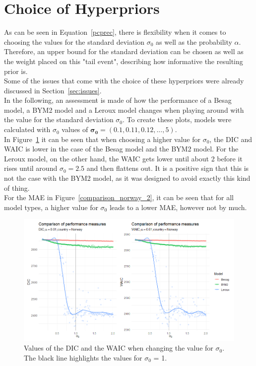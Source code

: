 \section{Choice of Hyperpriors}\label{sec:hyperprios}
As can be seen in Equation~\ref{pcprec}, there is flexibility when it comes to choosing the values for the standard deviation $\sigma_0$ as well as the probability $\alpha$. Therefore, an upper bound for the standard deviation can be chosen as well as the weight placed on this "tail event", describing how informative the resulting prior is. \\
Some of the issues that come with the choice of these hyperpriors were already discussed in Section~\ref{sec:issues}. \\
In the following, an assessment is made of how the performance of a Besag model, a BYM2 model and a Leroux model changes when playing around with the value for the standard deviation $\sigma_0$. To create these plots, models were calculated with $\sigma_0$ values of $\pmb{\sigma_0}=\left(0.1,0.11,0.12,...,5\right)$.\\
In Figure~\ref{comparison_norway_1} it can be seen that when choosing a higher value for $\sigma_0$, the DIC and WAIC is lower in the case of the Besag model and the BYM2 model. For the Leroux model, on the other hand, the WAIC gets lower until about 2 before it rises until around $\sigma_0 = 2.5$ and then flattens out. It is a positive sign that this is not the case with the BYM2 model, as it was designed to avoid exactly this kind of thing. \\
For the MAE in Figure~\ref{comparison_norway_2}, it can be seen that for all model types, a higher value for $\sigma_0$ leads to a lower MAE, however not by much.
\begin{figure}[H]
  \centering
  \includegraphics[width = \textwidth]{comparison_1_norway.png}
  \caption{Values of the DIC and the WAIC when changing the value for $\sigma_0$. The black line highlights the values for $\sigma_0$ = 1.}
  \label{comparison_norway_1}
\end{figure}

